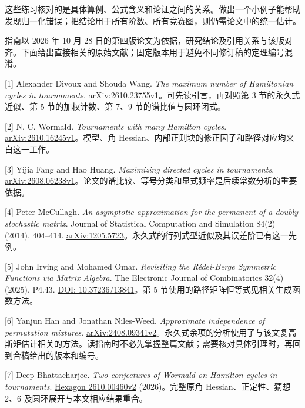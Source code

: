 \documentclass[11pt,a4paper]{article}
\makeatletter
\renewcommand\section{\@startsection{section}{1}{\z@}{-2.8ex plus -1ex minus -.2ex}{1.1ex plus .2ex}{\normalfont\large\bfseries}}
\makeatother
\begin{document}
这些练习核对的是具体算例、公式含义和论证之间的关系。做出一个小例子能帮助发现归一化错误；把结论用于所有阶数、所有竞赛图，则仍需论文中的统一估计。

\section{18. 继续阅读的文献}\label{ux7ee7ux7eedux9605ux8bfbux7684ux6587ux732e}

指南以 2026 年 10 月 28 日的第四版论文为依据，研究结论及引用关系与该版对齐。下面给出直接相关的原始文献；固定版本用于避免不同修订稿的定理编号混淆。

{[}1{]} Alexander Divoux and Shouda Wang. \emph{The maximum number of Hamiltonian cycles in tournaments}. \href{https://arxiv.org/html/2610.23755v1}{arXiv:2610.23755v1}。可先读引言，再对照第 3 节的永久式近似、第 5 节的加权计数、第 7、9 节的谱比值与圆环闭式。

{[}2{]} N. C. Wormald. \emph{Tournaments with many Hamilton cycles}. \href{https://arxiv.org/html/2610.16245v1}{arXiv:2610.16245v1}。模型、角 Hessian、内部正则块的修正因子和路径对应均来自这一工作。

{[}3{]} Yijia Fang and Hao Huang. \emph{Maximizing directed cycles in tournaments}. \href{https://arxiv.org/html/2608.06238v1}{arXiv:2608.06238v1}。论文的谱比较、等号分类和显式频率是后续常数分析的重要依据。

{[}4{]} Peter McCullagh. \emph{An asymptotic approximation for the permanent of a doubly stochastic matrix}. Journal of Statistical Computation and Simulation 84(2) (2014), 404--414. \href{https://arxiv.org/abs/1205.5723}{arXiv:1205.5723}。永久式的行列式型近似及其误差阶已有这一先例。

{[}5{]} John Irving and Mohamed Omar. \emph{Revisiting the Rédei-Berge Symmetric Functions via Matrix Algebra}. The Electronic Journal of Combinatorics 32(4) (2025), P4.43. \href{https://doi.org/10.37236/13841}{DOI: 10.37236/13841}。第 5 节使用的路径矩阵恒等式见相关生成函数方法。

{[}6{]} Yanjun Han and Jonathan Niles-Weed. \emph{Approximate independence of permutation mixtures}. \href{https://arxiv.org/html/2408.09341v2}{arXiv:2408.09341v2}。永久式余项的分析使用了与该文复高斯矩估计相关的方法。读指南时不必先掌握整篇文献；需要核对具体引理时，再回到合稿给出的版本和编号。

{[}7{]} Deep Bhattacharjee. \emph{Two conjectures of Wormald on Hamilton cycles in tournaments}. \href{https://hexagonmath.org/2610.00460v2}{Hexagon 2610.00460v2} (2026)。完整原角 Hessian、正定性、猜想 2、6 及圆环展开与本文相应结果重合。
\end{document}
